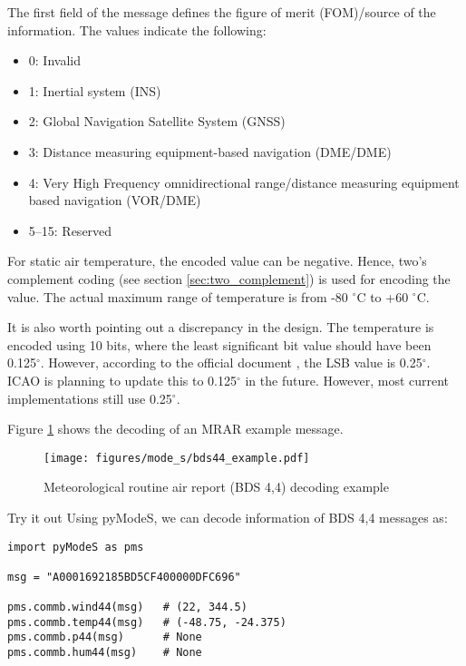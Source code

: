 The first field of the message defines the figure of merit (FOM)/source of the information. The values indicate the following:
\begin{itemize}
    \item 0: Invalid
    \item 1: Inertial system (INS)
    \item 2: Global Navigation Satellite System (GNSS)
    \item 3: Distance measuring equipment-based navigation (DME/DME)
    \item 4: Very High Frequency omnidirectional range/distance measuring equipment based navigation (VOR/DME)
    \item 5--15: Reserved
\end{itemize}

For static air temperature, the encoded value can be negative. Hence, two's complement coding (see section \ref{sec:two_complement}) is used for encoding the value. The actual maximum range of temperature is from -80 $^\circ$C to +60 $^\circ$C.

It is also worth pointing out a discrepancy in the design. The temperature is encoded using 10 bits, where the least significant bit value should have been 0.125$^\circ$. However, according to the official document \cite{icao9871v1}, the LSB value is 0.25$^\circ$. ICAO is planning to update this to 0.125$^\circ$ in the future. However, most current implementations still use 0.25$^\circ$. 

Figure \ref{fig:bds44_example} shows the decoding of an MRAR example message.

\begin{figure}[ht]
    \centering
    \texttt{[image: figures/mode\_s/bds44\_example.pdf]}
    \caption{Meteorological routine air report (BDS 4,4) decoding example}
    \label{fig:bds44_example}
  \end{figure}
  
\begin{notebox}{Try it out}
Using pyModeS, we can decode information of BDS 4,4 messages as: 

\begin{verbatim}
import pyModeS as pms

msg = "A0001692185BD5CF400000DFC696"

pms.commb.wind44(msg)   # (22, 344.5)
pms.commb.temp44(msg)   # (-48.75, -24.375)
pms.commb.p44(msg)      # None
pms.commb.hum44(msg)    # None
\end{verbatim}

\end{notebox}

